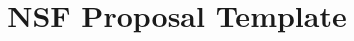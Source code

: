 \documentclass{NSF}
\begin{document}
	
	
	\title{NSF Proposal Template}
	
	
	
	\newpage{}
	
	
	\newpage{}
	\renewcommand\refname{References Cited}
	
	
	
	\newpage{}
	
	
	\newpage{}
	
	
	\newpage{}
	
	
	\newpage{}
	
	
	\newpage{}
	
\end{document}
